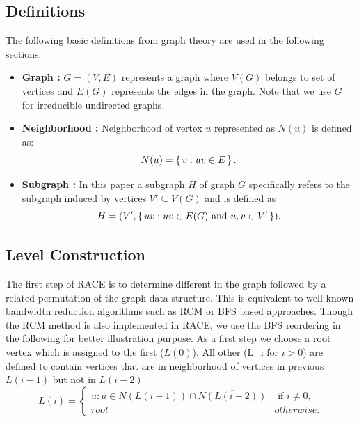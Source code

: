 \subsection*{Definitions}
The following basic definitions from graph theory are used in the following sections:
\begin{itemize}
	\item \textbf{Graph : } $G = (V,E)$ represents a graph where $V(G)$ belongs to set of vertices and $E(G)$ represents the edges in the graph. Note that we use $G$ for irreducible undirected graphs.
	\item \textbf{Neighborhood :} Neighborhood of vertex $u$ represented as $N(u)$ is defined as:
	\begin{equation*}
	  N(u) = \set{ v : uv \in E}.
	\end{equation*}
	\item \textbf{Subgraph :} In this paper a subgraph $H$ of graph $G$ specifically refers to the subgraph induced by vertices $V' \subseteq V(G)$ and is defined as
	\begin{equation*}
		H = (V', \set{ uv : uv \in E(G) \text{ and } u,v \in V'}).
	\end{equation*}
\end{itemize}

\subsection{Level Construction}\label{subsec:LEVEL_CONST}
The first step of \acrshort{RACE} is to determine different \textit{\levels} in the graph followed by a related permutation of the graph data structure. This is equivalent to well-known bandwidth reduction algorithms such as \acrfull{RCM} or \acrfull{BFS} \cite{BFS} based approaches. Though the RCM method is also implemented in \acrshort{RACE}, we use the  \acrshort{BFS} reordering in the following for better illustration purpose.
As a first step we choose a root vertex which is assigned to the first \level ($L(0)$). All other \levels (\acrshort{L_i} for $i > 0$) are defined to  contain vertices that are in neighborhood of vertices in previous \level $L(i-1)$ but not in \level $L(i-2)$ \cite{BFS_level_def} \ie
\begin{equation}\label{eq:level}
L(i) = 
\begin{cases}
	  u : u \in N(L(i-1)) \cap \overline{N(L(i-2))}  & \text{ if } i \neq 0, \\
	 root & otherwise.
\end{cases}   
\end{equation}

